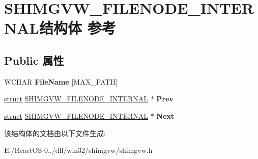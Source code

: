 \hypertarget{struct_s_h_i_m_g_v_w___f_i_l_e_n_o_d_e___i_n_t_e_r_n_a_l}{}\section{S\+H\+I\+M\+G\+V\+W\+\_\+\+F\+I\+L\+E\+N\+O\+D\+E\+\_\+\+I\+N\+T\+E\+R\+N\+A\+L结构体 参考}
\label{struct_s_h_i_m_g_v_w___f_i_l_e_n_o_d_e___i_n_t_e_r_n_a_l}
\subsection*{Public 属性}
\begin{DoxyCompactItemize}
\item 
\mbox{\label{struct_s_h_i_m_g_v_w___f_i_l_e_n_o_d_e___i_n_t_e_r_n_a_l_a37eec34530626ef7da68e574917b7117}} 
W\+C\+H\+AR {\bfseries File\+Name} \mbox{[}M\+A\+X\+\_\+\+P\+A\+TH\mbox{]}
\item 
\mbox{\label{struct_s_h_i_m_g_v_w___f_i_l_e_n_o_d_e___i_n_t_e_r_n_a_l_a30f242bf4617b2111391f675dd6940da}} 
\hyperlink{interfacestruct}{struct} \hyperlink{struct_s_h_i_m_g_v_w___f_i_l_e_n_o_d_e___i_n_t_e_r_n_a_l}{S\+H\+I\+M\+G\+V\+W\+\_\+\+F\+I\+L\+E\+N\+O\+D\+E\+\_\+\+I\+N\+T\+E\+R\+N\+AL} $\ast$ {\bfseries Prev}
\item 
\mbox{\label{struct_s_h_i_m_g_v_w___f_i_l_e_n_o_d_e___i_n_t_e_r_n_a_l_ad844c8ac2be7d3def85a564c39a496fb}} 
\hyperlink{interfacestruct}{struct} \hyperlink{struct_s_h_i_m_g_v_w___f_i_l_e_n_o_d_e___i_n_t_e_r_n_a_l}{S\+H\+I\+M\+G\+V\+W\+\_\+\+F\+I\+L\+E\+N\+O\+D\+E\+\_\+\+I\+N\+T\+E\+R\+N\+AL} $\ast$ {\bfseries Next}
\end{DoxyCompactItemize}


该结构体的文档由以下文件生成\+:\begin{DoxyCompactItemize}
\item 
E\+:/\+React\+O\+S-\/0../dll/win32/shimgvw/shimgvw.\+h\end{DoxyCompactItemize}
